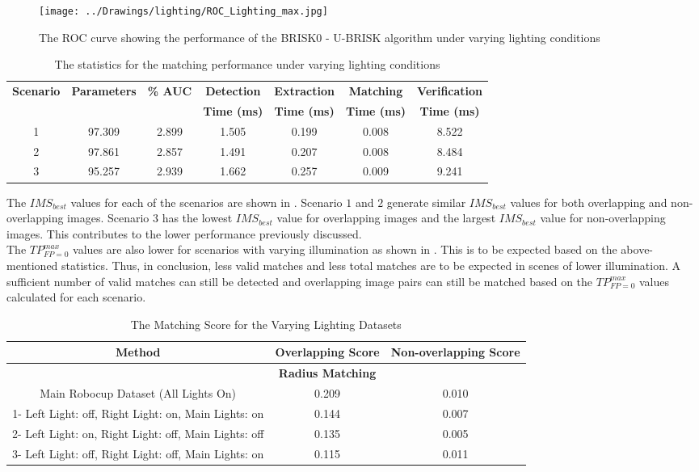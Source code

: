 \documentclass[11pt]{report}
\begin{document}
\begin{figure}[h!] 
  \centering
    \texttt{[image: ../Drawings/lighting/ROC\_Lighting\_max.jpg]}
    \caption{The ROC curve showing the performance of the BRISK0 - U-BRISK algorithm under varying lighting conditions}
    \label{fig:rocLighting}
\end{figure}

\begin{table}
\centering
\caption{The statistics for the matching performance under varying lighting conditions}
\footnotesize
\begin{tabular}{|c|c|c|c|c|c|c|}
\hline 
\textbf{Scenario} & \textbf{Parameters} & \textbf{\% AUC} & \textbf{Detection} & \textbf{Extraction} & \textbf{Matching} & \textbf{Verification}\tabularnewline
 &  &  & \textbf{Time (ms)} & \textbf{Time (ms)} & \textbf{Time (ms)} & \textbf{Time (ms)}\tabularnewline
\hline 
\hline 
1 & 97.309 & 2.899 & 1.505 & 0.199 & 0.008 & 8.522\tabularnewline
\hline 
2 & 97.861 & 2.857 & 1.491 & 0.207 & 0.008 & 8.484\tabularnewline
\hline 
3 & 95.257 & 2.939 & 1.662 & 0.257 & 0.009 & 9.241\tabularnewline
\hline 
\end{tabular}
\label{tab:lightingStats}
\end{table}




The $IMS_{best}$ values for each of the scenarios are shown in . Scenario $1$ and $2$ generate similar $IMS_{best}$ values for both overlapping and non-overlapping images. Scenario $3$ has the lowest $IMS_{best}$ value for overlapping images and the largest $IMS_{best}$ value for non-overlapping images. This contributes to the lower performance previously discussed.\\

The $TP_{FP=0}^{max}$ values are also lower for scenarios with varying illumination as shown in . This is to be expected based on the above-mentioned statistics. Thus, in conclusion, less valid matches and less total matches are to be expected in scenes of lower illumination. A sufficient number of valid matches can still be detected and overlapping image pairs can still be matched based on the $TP_{FP=0}^{max}$ values calculated for each scenario.\\

\begin{table}
\centering
\caption{The Matching Score for the Varying Lighting Datasets}
\begin{tabular}{|c|c|c|}
\hline 
\multicolumn{1}{|c||}{\textbf{Method}} & \multicolumn{1}{c||}{\textbf{Overlapping Score}} & \multicolumn{1}{c|}{\textbf{Non-overlapping Score}}\tabularnewline
\hline 
\hline 
 & \textbf{Radius Matching} & \tabularnewline
\hline 
Main Robocup Dataset (All Lights On) & 0.209 & 0.010\tabularnewline
\hline 
1- Left Light: off, Right Light: on, Main Lights: on & 0.144 & 0.007\tabularnewline
\hline 
2- Left Light: on, Right Light: off, Main Lights: off & 0.135 & 0.005\tabularnewline
\hline 
3- Left Light: off, Right Light: off, Main Lights: on & 0.115 & 0.011\tabularnewline
\hline 
\end{tabular}
\label{tab:ms_lighting}
\end{table}
\end{document}
